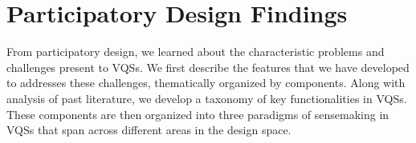 \section{Participatory Design Findings}
From participatory design, we learned about the characteristic problems and challenges present to VQSs. We first describe the features that we have developed to addresses these challenges, thematically organized by components. %
Along with analysis of past literature, we develop a taxonomy of key functionalities in VQSs. These components are then organized into three paradigms of sensemaking in VQSs that span across different areas in the design space.
